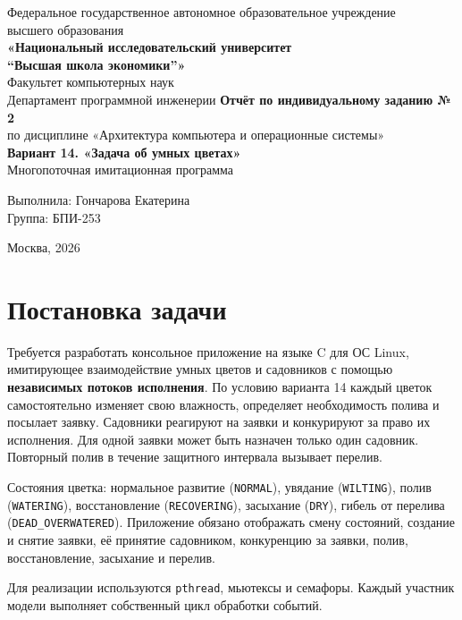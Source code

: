 \documentclass[12pt,a4paper]{article}
\begin{document}
\begin{titlepage}
\begin{center}
Федеральное государственное автономное образовательное учреждение\\
высшего образования\\[2mm]
\textbf{«Национальный исследовательский университет\\
``Высшая школа экономики''»}\\[3mm]
Факультет компьютерных наук\\
Департамент программной инженерии
\vfill
{\Large\bfseries Отчёт по индивидуальному заданию № 2}\\[4mm]
{\large по дисциплине «Архитектура компьютера и операционные системы»}\\[7mm]
{\Large\bfseries Вариант 14. «Задача об умных цветах»}\\[3mm]
{\large Многопоточная имитационная программа}
\vfill
\begin{flushright}
Выполнила: Гончарова Екатерина\\
Группа: БПИ-253
\end{flushright}
\vfill
Москва, 2026
\end{center}
\end{titlepage}

\tableofcontents
\newpage

\section{Постановка задачи}

Требуется разработать консольное приложение на языке C для ОС Linux,
имитирующее взаимодействие умных цветов и садовников с помощью
\textbf{независимых потоков исполнения}. По условию варианта 14 каждый
цветок самостоятельно изменяет свою влажность, определяет необходимость
полива и посылает заявку. Садовники реагируют на заявки и конкурируют за
право их исполнения. Для одной заявки может быть назначен только один
садовник. Повторный полив в течение защитного интервала вызывает перелив.

Состояния цветка: нормальное развитие (\texttt{NORMAL}), увядание
(\texttt{WILTING}), полив (\texttt{WATERING}), восстановление
(\texttt{RECOVERING}), засыхание (\texttt{DRY}), гибель от перелива
(\texttt{DEAD\_OVERWATERED}). Приложение обязано отображать смену
состояний, создание и снятие заявки, её принятие садовником, конкуренцию
за заявки, полив, восстановление, засыхание и перелив.

Для реализации используются \texttt{pthread}, мьютексы и семафоры.
Каждый участник модели выполняет собственный цикл обработки событий.
\end{document}
